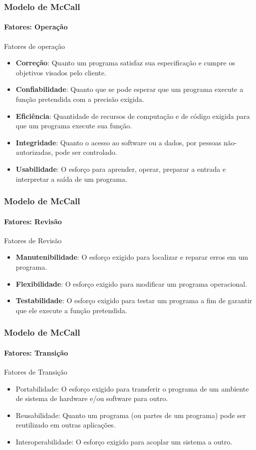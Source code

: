 \begin{frame}
	\frametitle{Modelo de McCall}
	\framesubtitle{Fatores: Operação}
	
	\begin{block:concept}{Fatores de operação}
		\begin{itemize}
			\item \textbf{Correção}: Quanto um programa satisfaz sua especificação e cumpre os
			objetivos visados pelo cliente.
			\item \textbf{Confiabilidade}: Quanto que se pode esperar que um programa execute a
			função pretendida com a precisão exigida.
			\item \textbf{Eficiência}: Quantidade de recursos de computação e de código exigida
			para que um programa execute sua função.
			\item \textbf{Integridade}: Quanto o acesso ao software ou a dados, por pessoas
			não-autorizadas, pode ser controlado.
			\item \textbf{Usabilidade}: O esforço para aprender, operar, preparar a entrada e
			interpretar a saída de um programa.
		\end{itemize}
	\end{block:concept}
\end{frame}

\begin{frame}
	\frametitle{Modelo de McCall}
	\framesubtitle{Fatores: Revisão}

	\begin{block:concept}{Fatores de Revisão}
		\begin{itemize}
			\item \textbf{Manutenibilidade}: O esforço exigido para localizar e reparar erros
			em um programa.
			\item \textbf{Flexibilidade}: O esforço exigido para modificar um programa
			operacional.
			\item \textbf{Testabilidade}: O esforço exigido para testar um programa a fim de
			garantir que ele execute a função pretendida.
		\end{itemize}
	\end{block:concept}
\end{frame}


\begin{frame}
	\frametitle{Modelo de McCall}
	\framesubtitle{Fatores: Transição}

	\begin{block:concept}{Fatores de Transição}
		\begin{itemize}
			\item Portabilidade: O esforço exigido para transferir o programa de um
			ambiente de sistema de hardware e/ou software para outro.
			\item Reusabilidade: Quanto um programa (ou partes de um programa) pode 
			ser reutilizado em outras aplicações.
			\item Interoperabilidade: O esforço exigido para acoplar um sistema a
			outro.
		\end{itemize}
	\end{block:concept}
\end{frame}

